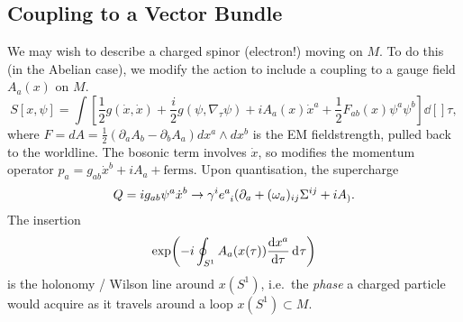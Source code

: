 \subsection{Coupling to a Vector Bundle}%
\label{sub:coupling_to_a_vector_bundle}

We may wish to describe a charged spinor (electron!) moving on $M$.
To do this (in the Abelian case), we modify the action to include a coupling to a gauge field $A_a (x)$ on $M$.
\begin{equation}
  S[x, \psi] = \int \left[ \frac{1}{2} g(\dot{x}, \dot{x}) + \frac{i}{2} g(\psi, \nabla_\tau \psi) + i A_a (x) \dot{x}^{a} + \frac{1}{2} F_{ab}(x) \psi^{a} \psi^{b} \right] \dd[]{\tau},
\end{equation}
where $F = dA = \frac{1}{2} (\partial_{a} A_b - \partial_{b} A_a) dx^{a} \wedge dx^{b}$ is the EM fieldstrength, pulled back to the worldline.
The bosonic term involves $\dot{x}$, so modifies the momentum operator $p_{a} = g_{ab} \dot{x}^{b} + i A_a + \text{ferms}$.
Upon quantisation, the supercharge 
\begin{equation}
  Q = i g_{ab} \psi^{a} \dot{x}^{b} \to \gamma^{i} e\indices{^{a}_{i}} (\partial_{a} + (\omega_a)_{ij} \Sigma^{ij} + i A_).
\end{equation}
The insertion 
\begin{equation}
  \exp(-i \oint_{S^1} A_a(x (\tau)) \dv{x^{a}}{\tau} \dd[]{\tau})
\end{equation}
is the holonomy / Wilson line around $x(S^1)$, i.e.~the \emph{phase} a charged particle would acquire as it travels around a loop $x(S^1) \subset M$.

